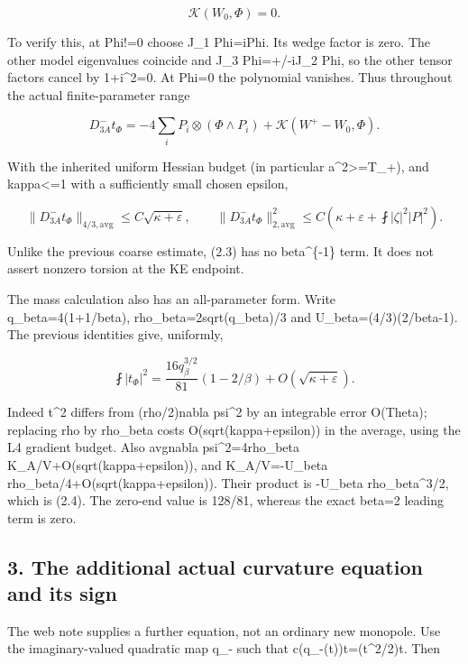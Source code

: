 \documentclass[
  10pt,
]{article}
\begin{document}
\[
 \mathcal K(W_0,\Phi)=0.                              \tag{2.1}
\]

To verify this, at Phi!=0 choose J\_1 Phi=iPhi. Its wedge factor is
zero. The other model eigenvalues coincide and J\_3 Phi=+/-iJ\_2 Phi, so
the other tensor factors cancel by 1+i\^{}2=0. At Phi=0 the polynomial
vanishes. Thus throughout the actual finite-parameter range

\[
 D^-_{3A}t_\Phi=-4\sum_i P_i\otimes(\Phi\wedge P_i)
       +\mathcal K(W^+-W_0,\Phi).                     \tag{2.2}
\]

With the inherited uniform Hessian budget (in particular
a\^{}2\textgreater=T\_+), and kappa\textless=1 with a sufficiently small
chosen epsilon,

\[
 \|D^-_{3A}t_\Phi\|_{4/3,\mathrm{avg}}
       \le C\sqrt{\kappa+\varepsilon},\qquad
 \|D^-_{3A}t_\Phi\|_{2,\mathrm{avg}}^2
       \le C\left(\kappa+\varepsilon+\fint|\zeta|^2|P|^2\right).
                                                               \tag{2.3}
\]

Unlike the previous coarse estimate, (2.3) has no beta\^{}\{-1\} term.
It does not assert nonzero torsion at the KE endpoint.

The mass calculation also has an all-parameter form. Write
q\_beta=4(1+1/beta), rho\_beta=2sqrt(q\_beta)/3 and
U\_beta=(4/3)(2/beta-1). The previous identities give, uniformly,

\[
 \boxed{\fint|t_\Phi|^2
 =\frac{16q_\beta^{3/2}}{81}(1-2/\beta)
       +O(\sqrt{\kappa+\varepsilon}).}                \tag{2.4}
\]

Indeed \textbar t\textbar\^{}2 differs from (rho/2)\textbar nabla
psi\textbar\^{}2 by an integrable error O(Theta); replacing rho by
rho\_beta costs O(sqrt(kappa+epsilon)) in the average, using the L4
gradient budget. Also avg\textbar nabla psi\textbar\^{}2=4rho\_beta
K\_A/V+O(sqrt(kappa+epsilon)), and K\_A/V=-U\_beta
rho\_beta/4+O(sqrt(kappa+epsilon)). Their product is -U\_beta
rho\_beta\^{}3/2, which is (2.4). The zero-end value is 128/81, whereas
the exact beta=2 leading term is zero.

\hypertarget{the-additional-actual-curvature-equation-and-its-sign}{%
\subsection{3. The additional actual curvature equation and its
sign}\label{the-additional-actual-curvature-equation-and-its-sign}}

The web note supplies a further equation, not an ordinary new monopole.
Use the imaginary-valued quadratic map q\_- such that
c(q\_-(t))t=(\textbar t\textbar\^{}2/2)t. Then
\end{document}
